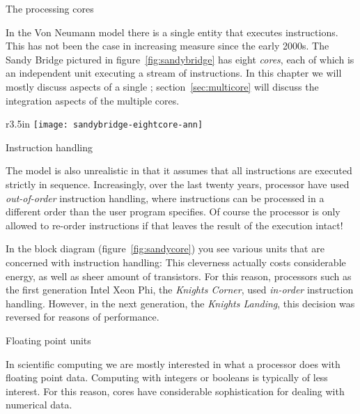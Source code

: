  {The processing cores}

In the Von Neumann model there is a single entity that executes instructions.
This has not been the case in increasing measure since the early 2000s.
The Sandy Bridge pictured in figure~\ref{fig:sandybridge} has eight \emph{cores},
each of which
is an independent unit executing a stream of instructions.
In this chapter we will mostly discuss aspects of a single ; 
section~\ref{sec:multicore} will discuss the integration aspects 
of the multiple cores.

\begin{wrapfigure}{r}{3.5in}
  \texttt{[image: sandybridge-eightcore-ann]}
  \caption{The Intel Sandy Bridge processor die.}
  \label{fig:sandybridge}
\end{wrapfigure}

 {Instruction handling}

The  model is also unrealistic
in that it assumes that all
instructions are executed strictly in sequence.  Increasingly, over
the last twenty years, processor have used
\emph{out-of-order}
instruction handling, where instructions can be processed
in a different order than the user program specifies. 
Of course the processor is only allowed to re-order instructions
if that leaves the result of the execution intact!

In the block diagram (figure~\ref{fig:sandycore}) you see various
units that are concerned with instruction handling: This cleverness
actually costs considerable energy, as well as sheer amount of
transistors. 
For this reason, processors such as the first generation
Intel Xeon Phi, the
\emph{Knights Corner},
used
\emph{in-order} instruction
handling.
However, in the next generation, the
\emph{Knights Landing},
this decision was reversed for reasons of performance.

 {Floating point units}
\label{sec:fma-trend}

In scientific computing we are mostly interested in what a processor
does with floating point data. Computing with integers or booleans 
is typically of less interest. For this reason, cores have
considerable sophistication for dealing with numerical data.

